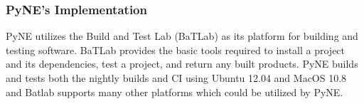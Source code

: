 \documentclass{anstrans}
\begin{document}
\subsubsection{PyNE's Implementation}

PyNE utilizes the Build and Test Lab (BaTLab) \cite{batlab_2014} as its platform for 
building and testing software. BaTLab provides the basic tools required to
install a project and its dependencies, test a project, and return any built
products. PyNE builds and tests both the nightly builds and CI using
Ubuntu 12.04 and MacOS 10.8 and Batlab supports many other platforms which could be utilized by PyNE.

\end{document}
